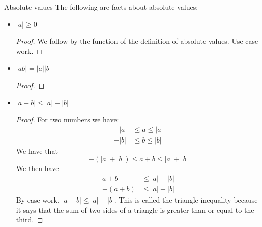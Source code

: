 \documentclass{report}
\begin{document}
\begin{theorem}{Absolute values}
    The following are facts about absolute values:
    \begin{itemize}
        \item $\lvert a \rvert \geq 0$
            \begin{proof}
                We follow by the function of the definition of absolute values. Use case work.
            \end{proof}

        \item $\lvert ab \rvert = \lvert a \rvert\lvert b \rvert$
            \begin{proof}
                
            \end{proof}

        \item $\lvert a + b \rvert \leq \lvert a \rvert + \lvert b \rvert$
            \begin{proof}
                For two numbers we have:
                    \begin{align*}
                        -\lvert a \rvert &\leq  a \leq \lvert a \rvert \\
                        -\lvert b \rvert &\leq  b \leq \lvert b \rvert   
                    \end{align*}
                We have that 
                    \begin{equation*}
                        -(\lvert a \rvert + \lvert b \rvert) \leq a + b \leq \lvert a \rvert + \lvert b \rvert
                    \end{equation*}
                We then have
                    \begin{align*}
                        a + b    &\leq \lvert a \rvert + \lvert b \rvert \\
                        -(a + b) &\leq \lvert a \rvert + \lvert b \rvert   
                    \end{align*}
                By case work, $\lvert a + b \rvert \leq \lvert a \rvert + \lvert b \rvert$. This is called the triangle inequality because it says that the sum of two sides of a triangle is greater than or equal to the third.
            \end{proof}
    \end{itemize}
\end{theorem}
\end{document}
